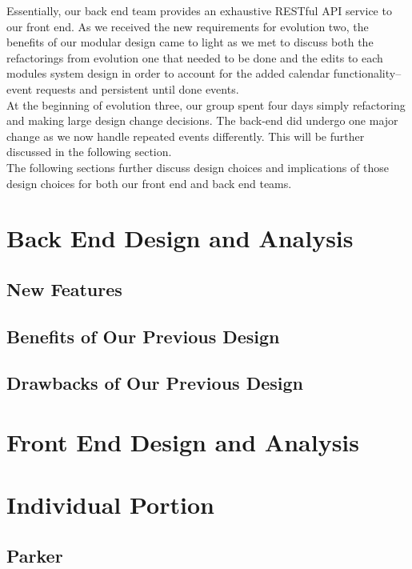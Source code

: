 \documentclass[11pt]{article}   %
\begin{document}
\noindent Essentially, our back end team provides an exhaustive RESTful API service to our front end. As we received the new requirements for evolution two, the benefits of our modular design came to light as we met to discuss both the refactorings from evolution one that needed to be done and the edits to each modules system design in order to account for the added calendar functionality--event requests and persistent until done events.\\

\noindent At the beginning of evolution three, our group spent four days simply refactoring and making large design change decisions. The back-end did undergo one major change as we now handle repeated events differently. This will be further discussed in the following section.\\

\noindent The following sections further discuss design choices and implications of those design choices for both our front end and back end teams. \\

\section{Back End Design and Analysis}
\subsection{New Features}



\subsection{Benefits of Our Previous Design}


\subsection{Drawbacks of Our Previous Design}



\section{Front End Design and Analysis}



\section{Individual Portion}
\subsection*{Parker}
\end{document}
